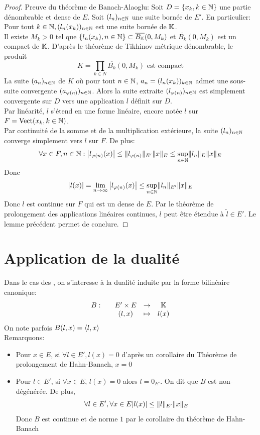 \documentclass[]{report}
\begin{document}
    \begin{proof}
        Preuve du théorème de Banach-Alaoglu: Soit $D=\{x_k,k\in \mathbb{N}\}$ une partie dénombrable et dense de $E$. Soit $(l_n)_{n\in\mathbb{N}}$ une suite bornée de $E'$. En particulier: Pour tout $k\in \mathbb{N}, (l_n(x_k))_{n\in\mathbb{N}}$ est une suite bornée de $\mathbb{K}$.\\
        Il existe $M_k>0$ tel que $\{l_n(x_k),n\in \mathbb{N}\}\subset \overline{B_{\mathbb{K}}}(0,M_k)$ et $\overline{B_k}(0,M_k)$ est un compact de $\mathbb{K}$. D'après le théorème de Tikhinov métrique dénombrable, le produit
        \[K=\prod_{k\in N} \overline{B_k}(0,M_k)\text{ est compact}\]
        La suite $(a_n)_{{n\in\mathbb{N}}}$ de $K$ où pour tout $n\in\mathbb{N}$, $a_n=(l_n(x_k))_{k\in \mathbb{N}}$ admet une sous-suite convergente $(a_{\varphi(n)})_{n\in\mathbb{N}}$. Alors la suite extraite $(l_{\varphi(n)})_{n\in\mathbb{N}}$ est simplement convergente sur $D$ vers une application $l$ définit sur $D$.\\
        Par linéarité, $l$ s'étend en une forme linéaire, encore notée $l$ sur $F=\text{Vect}(x_k,k\in \mathbb{N})$.\\
        Par continuité de la somme et de la multiplication extérieure, la suite $(l_n)_{n\in\mathbb{N}}$ converge simplement vers $l$ sur $F$. De plus:
        \[\forall x\in F, n\in \mathbb{N}:\left|l_{\varphi(n)}(x)\right|\le \lVert l_{\varphi(n)} \rVert_{E'}\lVert x \rVert_{E}\le \sup_{n\in \mathbb{N}}\lVert l_n \rVert_{E}\lVert x \rVert_E\]
        Donc
        \[\left|l(x)\right|=\lim_{n\to \infty}\left|l_{\varphi(n)}(x)\right|\le \sup_{{n\in\mathbb{N}}}\lVert l_n \rVert_{E'}\lVert x \rVert_E\]
        Donc $l$ est continue sur $F$ qui est un \sev dense de $E$. Par le théorème de prolongement des applications linéaires continues, $l$ peut être étendue à $\tilde{l}\in E'$. Le lemme précédent permet de conclure.
    \end{proof}

    \section{Application de la dualité}

    Dans le cas des \evn, on s'interesse à la dualité induite par la forme bilinéaire canonique:
    \[\begin{array}{ccccc} B : & & E'\times E & \to & \mathbb{K} \\ & & (l,x) & \mapsto & l(x) \end{array}\]
    On note parfois $B(l,x)=\langle l,x \rangle$\\
    Remarquons:\begin{itemize}
        \item Pour $x\in E$, si $\forall l\in E',l(x)=0$ d'après un corollaire du Théorème de prolongement de Hahn-Banach, $x=0$
        \item Pour $l\in E'$, si $\forall x\in E$, $l(x)=0$ alors $l=0_{E'}$. On dit que $B$ est non-dégénérée. De plus,
        \[ \forall l\in E',\forall x\in E |l(x)|\le \lVert l \rVert_{E'} \lVert x \rVert_E\]
        Donc $B$ est continue et de norme $1$ par le corollaire du théorème de Hahn-Banach
    \end{itemize}
\end{document}
